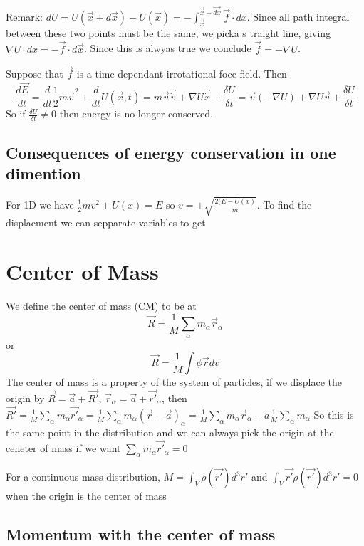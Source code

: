\documentclass{homework}
\begin{document}
Remark: $dU = U(\vec{x} + d\vec{x}) - U(\vec{x}) = -\int_{\vec{x}}^{\vec{x} + \vec{dx}}\vec{f}\cdot dx$. Since all path integral between these two points must be the same, we picka s traight line, giving $\nabla U \cdot dx = -\vec{f}\cdot d\vec{x}$. Since this is alwyas true we conclude $\vec{f} = - \nabla U$. 


Suppose that $\vec{f}$ is a time dependant irrotational foce field. Then
\[\frac{d\vec{E}}{dt} = \frac{d}{dt}\frac{1}{2}m\vec{v}^2 + \frac{d}{dt}U(\vec{x},t)  = m\vec{v}\vec{\dot{v}} + \nabla U \vec{\dot{x}} + \frac{\delta U}{\delta t} = \vec{v} (-\nabla U) + \nabla U \vec{v} + \frac{\delta U}{\delta t}\]
So if $\frac{\delta U}{\delta t} \neq 0$ then energy is no longer conserved.

\subsection{Consequences of energy conservation in one dimention}
For 1D we have $\frac{1}{2}mv^2 + U(x) = E$ so $v = \pm \sqrt{\frac{2(E-U(x)}{m}}$. To find the displacment we can sepparate variables to get





\section{Center of Mass}

We define the center of mass (CM) to be at
\[\vec{R} = \frac{1}{M}\sum_{\alpha}m_{\alpha}\vec{r}_{\alpha}\]
or
\[\vec{R} = \frac{1}{M} \int \phi \vec{r} dv\]
The center of mass is a property of the system of particles, if we displace the origin by $\vec{R} = \vec{a} + \vec{R'}$, $\vec{r}_{\alpha} = \vec{a} + \vec{r'}_{\alpha}$, then $\vec{R'} = \frac{1}{M}\sum_{\alpha}m_{\alpha}\vec{r'}_{\alpha} = \frac{1}{M}\sum_{\alpha}m_{\alpha}(\vec{r} - \vec{a})_{\alpha} = \frac{1}{M}\sum_{\alpha}m_{\alpha}\vec{r}_{\alpha} -a\frac{1}{M}\sum_{\alpha} m_{\alpha}$
So this is the same point in the distribution and we can always pick the origin at the ceneter of mass if we want $\sum_{\alpha}m_{\alpha}\vec{r'}_{\alpha} = 0$


For a continuous mass distribution, $M = \int_{V} \rho(\vec{r'})d^3r'$ and $ \int_{V} \vec{r'}\rho(\vec{r'})d^3r' = 0$ when the origin is the center of mass

\subsection{Momentum with the center of mass}
\end{document}
